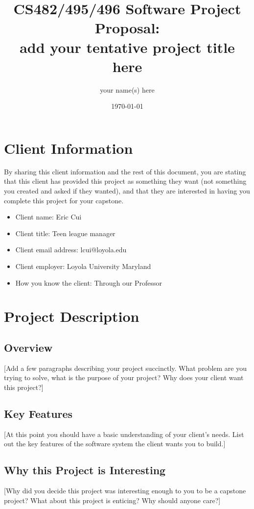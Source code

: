 \documentclass{article}
\title{CS482/495/496 Software Project Proposal: \\ 
add your tentative project title here}
\author{your name(s) here }
\date{\today}
\begin{document}
\maketitle %

\section{Client Information}
By sharing this client information and the rest of this document, you are stating that this client has provided this project as something they want (not something you created and asked if they wanted), and that they are interested in having you complete this project for your capstone.
\begin{itemize}
    \item Client name: Eric Cui
    \item Client title: Teen league manager
    \item Client email address: lcui@loyola.edu
    \item Client employer: Loyola University Maryland
    \item How you know the client: Through our Professor
\end{itemize}

\section{Project Description}

\subsection{Overview}
[Add a few paragraphs describing your project succinctly. What problem are you trying to solve, what is the purpose of your project? Why does your client want this project?]

\subsection{Key Features}
[At this point you should have a basic understanding of your client's needs. List out the key features of the software system the client wants you to build.]

\subsection{Why this Project is Interesting}
[Why did you decide this project was interesting enough to you to be a capstone project? What about this project is enticing? Why should anyone care?]
\end{document}
